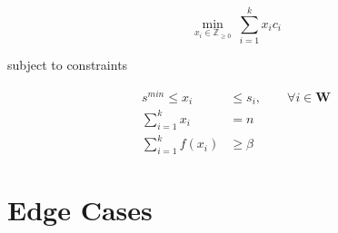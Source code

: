\documentclass[
    draft,
    final,
]{article}
\begin{document}
    \[ \min_{x_i \in \mathbb{Z}_{\geq 0}} \ \sum_{i=1}^k x_i c_i \]
    
    subject to constraints

    \begin{align*}
        s^{min} \leq x_i &\leq s_i,\qquad \forall i \in \mathbf{W} \\
        \sum_{i = 1}^k x_i &= n \\
        \sum_{i = 1}^k f(x_i) &\geq \beta
    \end{align*}
    
    
    
    
    
    
    
    
    
    
    
    
    \section{Edge Cases}
    
\end{document}
